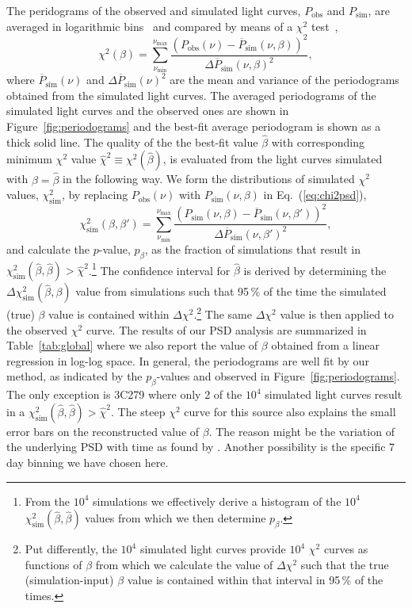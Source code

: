 \documentclass[twocolumn,linenumbers]{aastex62}
\begin{document}
The peridograms of the observed and simulated light curves, ${P}_\mathrm{obs}$ and ${P}_\mathrm{sim}$, are averaged in logarithmic bins~\citep{1993MNRAS.261..612P} and compared by means of a $\chi^2$ test~\citep{2014MNRAS.445..437M},
\begin{equation}
    \chi^2(\beta) = \sum_{\nu_\mathrm{min}}^{\nu_\mathrm{max}}\frac{(P_\mathrm{obs}(\nu) - \overline{P}_\mathrm{sim}(\nu,\beta))^2}{\Delta\overline{P}_\mathrm{sim}(\nu,\beta)^2},\label{eq:chi2psd}
\end{equation}
where $\overline{P}_\mathrm{sim}(\nu)$ and $\Delta\overline{P}_\mathrm{sim}(\nu)^2$ are the mean and variance of the periodograms obtained from the simulated light curves.
The averaged periodograms of the simulated light curves and the observed ones are shown in Figure~\ref{fig:periodograms} and the best-fit average periodogram is shown as a thick solid line. 
The quality of the the best-fit value $\hat\beta$ with corresponding minimum $\chi^2$ value $\hat\chi^2\equiv\chi^2(\hat\beta)$, is evaluated from the light curves simulated with $\beta = \hat\beta$ in the following way. We form the distributions of simulated $\chi^2$ values, $\chi^2_\mathrm{sim}$, by replacing $P_\mathrm{obs}(\nu)$ with $P_\mathrm{sim}(\nu,\beta)$ in Eq.~(\ref{eq:chi2psd}),
\begin{equation}
    \chi^2_\mathrm{sim}(\beta,\beta') = \sum_{\nu_\mathrm{min}}^{\nu_\mathrm{max}}\frac{(P_\mathrm{sim}(\nu,\beta) - \overline{P}_\mathrm{sim}(\nu,\beta'))^2}{\Delta\overline{P}_\mathrm{sim}(\nu,\beta')^2},\label{eq:chi2psd_sim}
\end{equation}
and calculate the $p$-value, $p_\beta$, as the  fraction of simulations that result in $\chi^2_\mathrm{sim}(\hat\beta,\hat\beta) > \hat\chi^2$.\footnote{From the $10^4$ simulations we effectively derive a histogram of the $10^4$ $\chi^2_\mathrm{sim}(\hat\beta,\hat\beta)$ values from which we then determine $p_\beta$.}
The confidence interval for $\hat\beta$ is derived by determining the $\Delta\chi^2_\mathrm{sim}(\hat{\beta},\beta)$ value from simulations such that 95\,\% of the time the simulated (true) $\beta$ value is contained within $\Delta\chi^2$.\footnote{Put differently, the $10^4$ simulated light curves provide $10^4$ $\chi^2$ curves as functions of $\beta$ from which we calculate the value of $\Delta\chi^2$ such that the true (simulation-input) $\beta$ value is contained within that interval in 95\,\% of the times.}
The same $\Delta\chi^2$ value is then applied to the observed $\chi^2$ curve.
The results of our PSD analysis are summarized in Table~\ref{tab:global} where we also report the value of $\beta$ obtained from a linear regression in log-log space. 
In general, the periodograms are well fit by our method, as indicated by the $p_\beta$-values and observed in Figure~\ref{fig:periodograms}. 
The only exception is 3C279 where only 2 of the $10^4$ simulated light curves result in a $\chi^2_\mathrm{sim}(\hat\beta,\hat\beta) > \hat\chi^2$.
The steep $\chi^2$ curve for this source also explains the small error bars on the reconstructed value of $\beta$.
The reason might be
the variation of the underlying PSD with time as found by \citet{TheFermi-LAT:2016dss}. Another possibility is
the specific 7 day binning we have chosen here.
\end{document}
